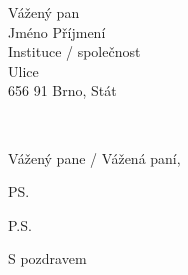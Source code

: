 \documentclass[a4paper,11pt,oneside,onecolumn,final]{letter}
\makeatletter
\renewcommand*{\opening}[1]{%
  \thispagestyle{firstpage}%
  \begin{flushright}
    \toname \\ \toaddress
  \end{flushright}
  \vspace{2\parskip}%
  #1\par\nobreak}
\renewcommand{\closing}[1]{\par\nobreak\vspace{\parskip}%
  \stopbreaks
  \noindent
  \ifx\@empty\fromaddress\else
  \hspace*{\longindentation}\fi
  \parbox{\indentedwidth}{\raggedright
       \ignorespaces #1\\[6\medskipamount]%
       \ifx\@empty\fromsig
           \fromname
       \else \fromsig \fi\strut}%
   \par}
\makeatother
\begin{document}
\begin{letter}{%
  Vážený pan \\
  Jméno Příjmení \\
  Instituce / společnost \\
  Ulice \\
  656 91 Brno, Stát }
\opening{Vážený pane / Vážená paní,}

\Blindtext

\ps

P.S. \blindtext

\closing{S pozdravem}



\end{letter}
\end{document}
